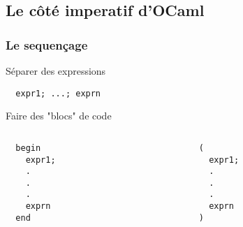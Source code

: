 \subsection{Le côté imperatif d'OCaml} %

\begin{frame}[fragile]
	\frametitle{Le sequençage}
		\begin{block}{Séparer des expressions}
			\begin{lstlisting}
  expr1; ...; exprn
			\end{lstlisting}
		\end{block}
		\begin{block}{Faire des "blocs" de code}
			\begin{columns}
				\begin{column}{3cm}
					\begin{lstlisting}
  begin
    expr1; 
    .
    .
    .
    exprn
  end
					\end{lstlisting}
				\end{column}
				\begin{column}{7cm}
					\begin{lstlisting}
  ( 
    expr1; 
    .
    .
    .
    exprn
  )
					\end{lstlisting}
				\end{column}
			\end{columns}
		\end{block}
\end{frame}

